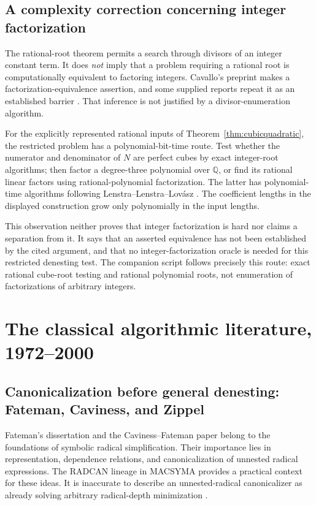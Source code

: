 \documentclass[11pt,oneside]{article}
\numberwithin{equation}{section}
\theoremstyle{definition}
\theoremstyle{remark}
\newcommand{\Q}{\mathbb{Q}}
\begin{document}
\subsection{A complexity correction concerning integer factorization}
The rational-root theorem permits a search through divisors of an integer constant term. It does \emph{not} imply that a problem requiring a rational root is computationally equivalent to factoring integers. Cavallo's preprint makes a factorization-equivalence assertion, and some supplied reports repeat it as an established barrier \cite{cavallo}. That inference is not justified by a divisor-enumeration algorithm.

For the explicitly represented rational inputs of Theorem~\ref{thm:cubicquadratic}, the restricted problem has a polynomial-bit-time route. Test whether the numerator and denominator of $N$ are perfect cubes by exact integer-root algorithms; then factor a degree-three polynomial over $\Q$, or find its rational linear factors using rational-polynomial factorization. The latter has polynomial-time algorithms following Lenstra--Lenstra--Lov\'asz \cite{lll}. The coefficient lengths in the displayed construction grow only polynomially in the input lengths.

This observation neither proves that integer factorization is hard nor claims a separation from it. It says that an asserted equivalence has not been established by the cited argument, and that no integer-factorization oracle is needed for this restricted denesting test. The companion script follows precisely this route: exact rational cube-root testing and rational polynomial roots, not enumeration of factorizations of arbitrary integers.

\section{The classical algorithmic literature, 1972--2000}\label{sec:classical}

\subsection{Canonicalization before general denesting: Fateman, Caviness, and Zippel}
Fateman's dissertation and the Caviness--Fateman paper belong to the foundations of symbolic radical simplification. Their importance lies in representation, dependence relations, and canonicalization of unnested radical expressions. The RADCAN lineage in MACSYMA provides a practical context for these ideas. It is inaccurate to describe an unnested-radical canonicalizer as already solving arbitrary radical-depth minimization \cite{fateman,caviness}.
\end{document}
